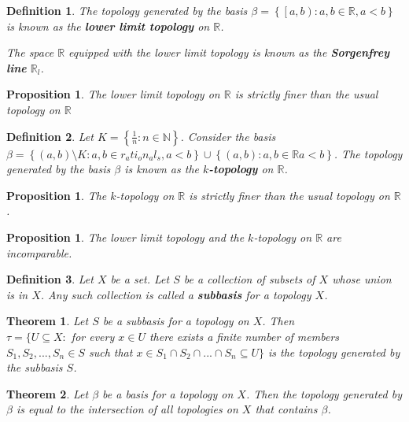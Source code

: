 \documentclass[12pt,twoside]{report}
\newtheorem{defn}{Definition}
\newtheorem{thm}{Theorem}
\newtheorem{prop}[subsection]{Proposition}
\begin{document}
\begin{defn}
    The topology generated by the basis $\beta = \left\{ \left [a, b\right )  :  a, b \in \mathbb{R}, a < b \right\}$ is known as the \textbf{lower limit topology} on $\mathbb{R}$. 

    The space $\mathbb{R}$ equipped with the lower limit topology is known as the \textbf{Sorgenfrey line} $\mathbb{R}_l$.
\end{defn}

\begin{prop}
    The lower limit topology on $\mathbb{R}$ is strictly finer than the usual topology on $\mathbb{R}$
\end{prop}

\begin{defn}
    Let $K = \left\{ \frac{1}{n}  :  n \in \mathbb{N} \right\}$. Consider the basis $\beta = \left\{ \left (a, b\right ) \setminus K  :  a,b \in r_at    i_on_al_s, a < b \right\} \cup \left\{ \left (a,b\right )  :  a,b \in \mathbb{R} a < b \right\}$.  The topology generated by the basis $\beta$ is known as the \textbf{$k$-topology} on $\mathbb{R}$.
\end{defn}

\begin{prop}
    The $k$-topology on $\mathbb{R}$ is strictly finer than the usual topology on $\mathbb{R}$.
\end{prop}

\begin{prop}
    The lower limit topology and the $k$-topology on $\mathbb{R}$ are incomparable.
\end{prop}


\begin{defn}
    Let $X$ be a set. Let $S$ be a collection of subsets of $X$ whose union is in $X$. Any such collection is called a \textbf{subbasis} for a topology $X$.
\end{defn}

\begin{thm}
    Let $S$ be a subbasis for a topology on $X$. Then
    \\ $\tau = \{ U \subseteq X  :  $ for every $ x \in U $ there exists a finite number of members $ S_1, S_2, ..., S_n \in S $ such that $ x \in S_1 \cap S_2 \cap ... \cap S_n \subseteq U \}$ is the topology generated by the subbasis $S$.
\end{thm}

\begin{thm}
    Let $\beta$ be a basis for a topology on $X$. Then the topology generated by $\beta$ is equal to the intersection of all topologies on $X$ that contains $\beta$.
\end{thm}
\end{document}
